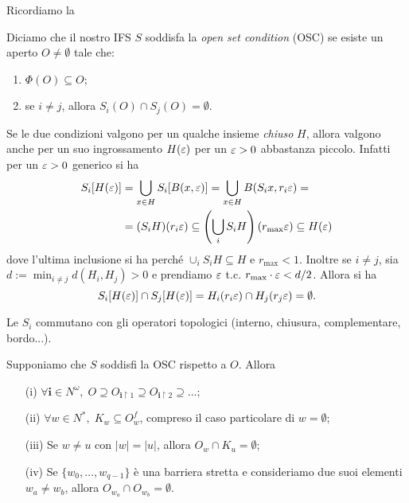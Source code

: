 Ricordiamo la 
\begin{definizione}
	Diciamo che il nostro IFS $S$ soddisfa la \emph{open set condition} (OSC) se esiste un aperto $O\neq\emptyset$ tale che:
	\begin{enumerate}
		\item $\Phi(O) \subseteq O$;
		\item se $i\neq j$, allora $S_{i}(O)\cap S_{j}(O) = \emptyset$.
	\end{enumerate}
\end{definizione}

\begin{osservazione}
	Se le due condizioni valgono per un qualche insieme \emph{chiuso} $H$, allora valgono anche per un suo ingrossamento $H(\varepsilon)$ per un $\varepsilon>0$ abbastanza piccolo.
	Infatti per un $\varepsilon>0$ generico si ha 
	\begin{align*}
		S_{i}[H(\varepsilon)] &= 
		\bigcup_{x\in H}S_{i}[B(x,\varepsilon)] = 
		\bigcup_{x\in H}B(S_{i}x, r_{i}\varepsilon) = \\ &=
		(S_{i}H)(r_{i}\varepsilon) \subseteq
		\left(\bigcup_{i}S_{i}H\right)(r_{\max}\varepsilon) \subseteq
		H(\varepsilon)
	\end{align*}
	dove l'ultima inclusione si ha perché $\cup_{i}S_{i}H\subseteq H$ e $r_{\max}<1$.
	Inoltre se $i\neq j$, sia $d:=\min_{i\neq j}d(H_{i},H_{j})>0$ e prendiamo $\varepsilon$ t.c. $r_{\max}\cdot\varepsilon<d/2$.
	Allora si ha 
	$$S_{i}[H(\varepsilon)]\cap S_{j}[H(\varepsilon)] = H_{i}(r_{i}\varepsilon)\cap H_{j}(r_{j}\varepsilon) = \emptyset.$$
\end{osservazione}

\begin{osservazione}
	Le $S_{i}$ commutano con gli operatori topologici (interno, chiusura, complementare, bordo...).
\end{osservazione}

\begin{lemma}
	Supponiamo che $S$ soddisfi la OSC rispetto a $O$. Allora 
	\begin{enumerate}
		\item[(i)] $\forall\mathbf i\in N^{\omega},\; O\supseteq O_{\mathbf i\upharpoonright1}\supseteq O_{\mathbf i\upharpoonright2}\supseteq\dots$;
		\item[(ii)] $\forall w\in N^{*},\; K_{w}\subseteq O_{w}^{f}$, compreso il caso particolare di $w = \emptyset$; 
		\item[(iii)] Se $w\neq u$ con $|w| = |u|$, allora $O_{w}\cap K_{u} = \emptyset$;
		\item[(iv)] Se $\{w_{0},\dots,w_{q-1}\}$ è una barriera stretta e consideriamo due suoi elementi $w_{a}\neq w_{b}$, allora $O_{w_{a}}\cap O_{w_{b}} = \emptyset$.
	\end{enumerate}
\end{lemma}

